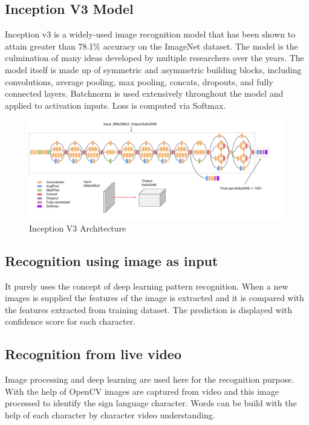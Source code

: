 \subsection{Inception V3 Model}
\par
Inception v3 is a widely-used image recognition model that has been shown to attain greater than 78.1\% accuracy on the ImageNet dataset. The model is the culmination of many ideas developed by multiple researchers over the years.
The model itself is made up of symmetric and asymmetric building blocks, including convolutions, average pooling, max pooling, concats, dropouts, and fully connected layers. Batchnorm is used extensively throughout the model and applied to activation inputs. Loss is computed via Softmax.
\begin{figure}[H]
\centering
\includegraphics[scale=0.46]{two}
\caption{Inception V3 Architecture}
\end{figure}



\subsection{Recognition using image as input}
\par
It purely uses the concept of deep learning pattern recognition. When a new images is supplied the features of the image is extracted and it is compared with the features extracted from training dataset. The prediction is displayed with confidence score for each character.

\subsection{Recognition from live video}
\par
Image processing and deep learning are used here for the recognition purpose. With the help of OpenCV images are captured from video and this image processed to identify the sign language character. Words can be build with the help of each character by character video understanding. 

